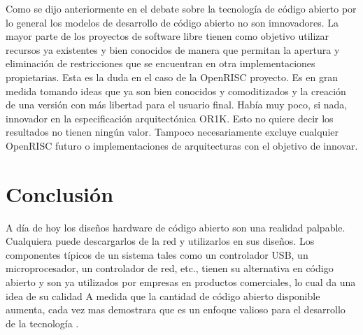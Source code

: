 Como se dijo anteriormente en el debate sobre la tecnología de código abierto por lo general los modelos de desarrollo de código abierto no son imnovadores.
 La mayor parte de los proyectos de software libre tienen como objetivo utilizar recursos ya existentes y bien conocidos de manera que permitan la apertura y eliminación de restricciones que se encuentran en otra implementaciones propietarias. Esta es la duda en el caso de la OpenRISC proyecto. Es en gran medida tomando ideas que ya son bien conocidos y comoditizados
y la creación de una versión con más libertad para el usuario final. Había muy poco, si
nada, innovador en la especificación arquitectónica OR1K. Esto no quiere decir
los resultados no tienen ningún valor. Tampoco necesariamente excluye cualquier OpenRISC futuro
o implementaciones de arquitecturas con el objetivo de innovar.

\section{Conclusión}

A día de hoy los diseños hardware de código abierto son una realidad palpable. Cualquiera puede descargarlos de la red y utilizarlos en sus diseños. Los componentes típicos de un sistema tales como un controlador USB, un microprocesador, un controlador de red, etc., tienen su alternativa en código abierto y son ya utilizados por empresas en productos comerciales, lo cual da una idea de su calidad
 A medida que la cantidad de código abierto disponible aumenta, cada vez mas demostrara que es un enfoque valioso para el desarrollo de la tecnología .



\begin{figure}[h!]
 \begin{center}
  \label{fig:esquema}
 \end{center}
\end{figure}




